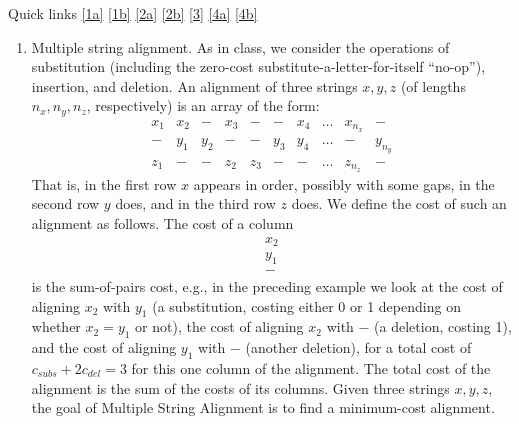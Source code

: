 \documentclass[12pt]{article}
\begin{document}
\renewcommand{\headrulewidth}{0.5pt}
\phantom{Test}

Quick links \ref{1a} \ref{1b} \qquad \ref{2a} \ref{2b} \qquad \ref{3} \qquad \ref{4a} \ref{4b}


\vspace{-3mm}
\begin{enumerate}
		 
\item Multiple string alignment. As in class, we consider the operations of substitution (including the zero-cost substitute-a-letter-for-itself ``no-op''), insertion, and deletion. An alignment of three strings $x,y,z$ (of lengths $n_x, n_y, n_z$, respectively) is an array of the form:
\[
\begin{array}{cccccccccc}
x_1 & x_2 & - & x_3 & - & - & x_4 & \dotsc & x_{n_x} & - \\
- & y_1 & y_2 & - & - & y_3 & y_4 & \dotsc & - & y_{n_y} \\
z_1 & - & - & z_2 & z_3 & - & - & \dotsc & z_{n_z} & -
\end{array}
\]
That is, in the first row $x$ appears in order, possibly with some gaps, in the second row $y$ does, and in the third row $z$ does. We define the cost of such an alignment as follows. The cost of a column
\[
\begin{array}{c}
x_2 \\
y_1 \\
-
\end{array}
\] 
is the sum-of-pairs cost, e.g., in the preceding example we look at the cost of aligning $x_2$ with $y_1$ (a substitution, costing either 0 or 1 depending on whether $x_2 = y_1$ or not), the cost of aligning $x_2$ with $-$ (a deletion, costing 1), and the cost of aligning $y_1$ with $-$ (another deletion), for a total cost of $c_{subs} + 2 c_{del} = 3$ for this one column of the alignment. The total cost of the alignment is the sum of the costs of its columns. Given three strings $x,y,z$, the goal of Multiple String Alignment is to find a minimum-cost alignment.


\end{enumerate}
\end{document}
